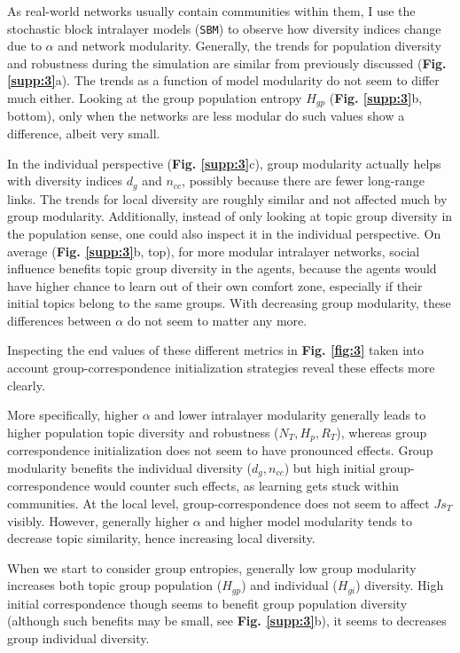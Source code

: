 \documentclass{svproc}
\begin{document}
As real-world networks usually contain communities within them, I use the stochastic block intralayer models (\texttt{SBM}) to observe how diversity indices change due to $\alpha$ and network modularity. Generally, the trends for population diversity and robustness during the simulation are similar from previously discussed (\textbf{Fig. \ref{supp:3}}a). The trends as a function of model modularity do not seem to differ much either. Looking at the group population entropy $H_{gp}$ (\textbf{Fig. \ref{supp:3}}b, bottom), only when the networks are less modular do such values show a difference, albeit very small.

In the individual perspective (\textbf{Fig. \ref{supp:3}}c), group modularity actually helps with diversity indices $d_g$ and $n_{cc}$, possibly because there are fewer long-range links. The trends for local diversity are roughly similar and not affected much by group modularity. Additionally, instead of only looking at topic group diversity in the population sense, one could also inspect it in the individual perspective. On average (\textbf{Fig. \ref{supp:3}}b, top), for more modular intralayer networks, social influence benefits topic group diversity in the agents, because the agents would have higher chance to learn out of their own comfort zone, especially if their initial topics belong to the same groups. With decreasing group modularity, these differences between $\alpha$ do not seem to matter any more.

Inspecting the end values of these different metrics in \textbf{Fig. \ref{fig:3}} taken into account group-correspondence initialization strategies reveal these effects more clearly.

More specifically, higher $\alpha$ and lower intralayer modularity generally leads to higher population topic diversity and robustness ($N_T, H_p, R_T$), whereas group correspondence initialization does not seem to have pronounced effects. Group modularity benefits the individual diversity ($d_g, n_{cc}$) but high initial group-correspondence would counter such effects, as learning gets stuck within communities. At the local level, group-correspondence does not seem to affect $Js_T$ visibly. However, generally higher $\alpha$ and higher model modularity tends to decrease topic similarity, hence increasing local diversity.

When we start to consider group entropies, generally low group modularity increases both topic group population ($H_{gp}$) and individual ($H_{gi}$) diversity. High initial correspondence though seems to benefit group population diversity (although such benefits may be small, see \textbf{Fig. \ref{supp:3}}b), it seems to decreases group individual diversity.
\end{document}
